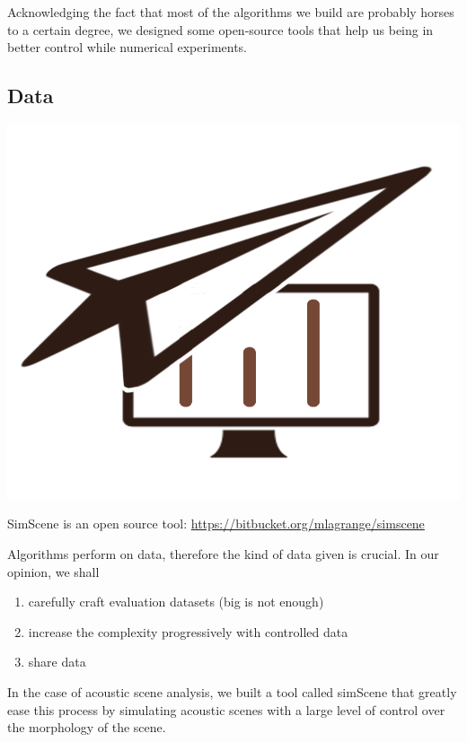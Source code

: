 \documentclass[a4paper,fleqn]{tufte-handout}
\begin{document}
Acknowledging the fact that most of the algorithms we build are probably horses to a certain degree, we designed some open-source tools that help us being in better control while numerical experiments.

\subsection{Data}

\begin{marginfigure}
\begin{center}
\includegraphics[width=\textwidth]{figures/logo} 
\end{center}
\caption{\label{fig:simScene} SimScene is an open source tool: \url{https://bitbucket.org/mlagrange/simscene}}
\end{marginfigure}

Algorithms perform on data, therefore the kind of data given is crucial. In our opinion, we shall
\begin{enumerate}
\item carefully craft evaluation datasets (big is not enough)
\item increase the complexity progressively with controlled data
\item share data
\end{enumerate}

In the case of acoustic scene analysis, we built a tool called \textsf{simScene} that greatly ease this process by simulating acoustic scenes with a large level of control over the morphology of the scene.%
\end{document}

